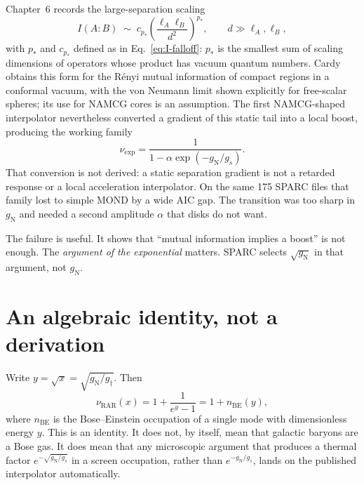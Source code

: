 Chapter~6 records the large-separation scaling
\begin{equation}
  \label{eq:appE-I}
  I(A:B)
  \;\sim\;
  c_{p_*}
  \left(\frac{\ell_A\ell_B}{d^2}\right)^{p_*},
  \qquad d\gg\ell_A,\ell_B,
\end{equation}
with \(p_*\) and \(c_{p_*}\) defined as in
Eq.~\eqref{eq:I-falloff}: \(p_*\) is the smallest sum of scaling
dimensions of operators whose product has vacuum quantum numbers.
Cardy~\cite{Cardy2013MI} obtains this form for the R\'enyi mutual
information of compact regions in a conformal vacuum, with the von
Neumann limit shown explicitly for free-scalar spheres; its use for
NAMCG cores is an assumption. The first NAMCG-shaped interpolator
nevertheless converted a gradient of this static tail into a local
boost, producing the working family
\begin{equation}
  \label{eq:appE-exp}
  \nu_{\mathrm{exp}}
  =\frac{1}{1-\alpha\exp(-g_{\mathrm{N}}/g_s)}.
\end{equation}
That conversion is not derived: a static separation gradient is not
a retarded response or a local acceleration interpolator.
On the same 175 SPARC files that family lost to simple MOND by a
wide AIC gap. The transition was too sharp in \(g_{\mathrm{N}}\)
and needed a second amplitude \(\alpha\) that disks do not want.

The failure is useful. It shows that ``mutual information
implies a boost'' is not enough. The \emph{argument of the
exponential} matters. SPARC selects \(\sqrt{g_{\mathrm{N}}}\)
in that argument, not \(g_{\mathrm{N}}\).

\section{An algebraic identity, not a derivation}
\label{sec:appE-BE}

Write \(y=\sqrt{x}=\sqrt{g_{\mathrm{N}}/g_\dagger}\). Then
\begin{equation}
  \label{eq:appE-BE}
  \nu_{\mathrm{RAR}}(x)
  =1+\frac{1}{e^{y}-1}
  =1+n_{\mathrm{BE}}(y),
\end{equation}
where \(n_{\mathrm{BE}}\) is the Bose--Einstein occupation of a
single mode with dimensionless energy \(y\). This is an identity.
It does not, by itself, mean that galactic baryons are a Bose
gas. It does mean that any microscopic argument that produces a
thermal factor \(e^{-\sqrt{g_{\mathrm{N}}/g_s}}\) in a
screen occupation, rather than \(e^{-g_{\mathrm{N}}/g_s}\),
lands on the published interpolator automatically.

